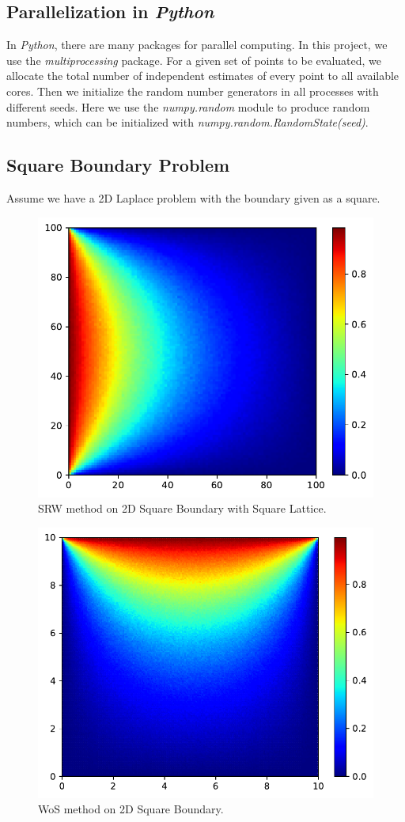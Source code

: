\documentclass[aps, prl, reprint, groupedaddress]{revtex4-1}
\begin{document}
\subsection{Parallelization in \emph{Python}}

In \emph{Python}, there are many packages for parallel computing. In this project, we use the \emph{multiprocessing} package. For a given set of points to be evaluated, we allocate the total number of independent estimates of every point to all available cores. Then we initialize the random number generators in all processes with different seeds. Here we use the \emph{numpy.random} module to produce random numbers, which can be initialized with \emph{numpy.random.RandomState(seed)}.

\subsection{Square Boundary Problem}

Assume we have a 2D Laplace problem with the boundary given as a square.

\begin{figure}[htbp]
    \centering
    \includegraphics[width=.4\textwidth]{./figs/srw_s}
    \caption{\label{fig:srw_s} SRW method on 2D Square Boundary with Square Lattice.}
\end{figure}

\begin{figure}[htbp]
    \centering
    \includegraphics[width=.4\textwidth]{./figs/wos_s}
    \caption{\label{fig:wos_s} WoS method on 2D Square Boundary.}
\end{figure}
\end{document}
